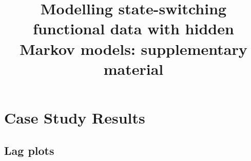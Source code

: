 \documentclass{article}
\begin{document}



\title{Modelling state-switching functional data with hidden Markov models: supplementary material}%


\maketitle

\addtocounter{tablenum}{1}
\addtocounter{fignum}{1}

\section{Case Study Results}

    \subsection{Lag plots}
        
\end{document}

